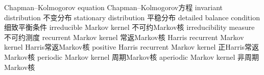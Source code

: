 {Chapman--Kolmogorov equation}
{Chapman--Kolmogorov方程}
{invariant distribution}
{不变分布}
{stationary distribution}
{平稳分布}
{detailed balance condition}
{细致平衡条件}
{irreducible Markov kernel}
{不可约Markov核}
{irreducibility measure}
{不可约测度}
{recurrent Markov kernel}
{常返Markov核}
{Harris recurrent Markov kernel}
{Harris常返Markov核}
{positive Harris recurrent Markov kernel}
{正Harris常返Markov核}
{periodic Markov kernel}
{周期Markov核}
{aperiodic Markov kernel}
{非周期Markov核}
